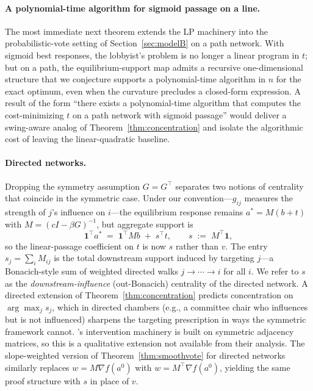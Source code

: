 \documentclass[11pt,letterpaper]{article}
\theoremstyle{plain}
\theoremstyle{definition}
\theoremstyle{remark}
\begin{document}
\paragraph{A polynomial-time algorithm for sigmoid passage on a line.} The most immediate next theorem extends the LP machinery into the probabilistic-vote setting of Section~\ref{sec:modelB} on a path network. With sigmoid best responses, the lobbyist's problem is no longer a linear program in $t$; but on a path, the equilibrium-support map admits a recursive one-dimensional structure that we conjecture supports a polynomial-time algorithm in $n$ for the exact optimum, even when the curvature precludes a closed-form expression. A result of the form ``there exists a polynomial-time algorithm that computes the cost-minimizing $t$ on a path network with sigmoid passage'' would deliver a swing-aware analog of Theorem~\ref{thm:concentration} and isolate the algorithmic cost of leaving the linear-quadratic baseline.

\paragraph{Directed networks.} Dropping the symmetry assumption $G = G^\top$ separates two notions of centrality that coincide in the symmetric case. Under our convention---$g_{ij}$ measures the strength of $j$'s influence on $i$---the equilibrium response remains $a^* = M(b + t)$ with $M = (cI - \beta G)^{-1}$, but aggregate support is
\[
\mathbf{1}^\top a^* \;=\; \mathbf{1}^\top M b \;+\; s^\top t, \qquad s \;:=\; M^\top \mathbf{1},
\]
so the linear-passage coefficient on $t$ is now $s$ rather than $v$. The entry $s_j = \sum_i M_{ij}$ is the total downstream support induced by targeting $j$---a Bonacich-style sum of weighted directed walks $j \to \cdots \to i$ for all $i$. We refer to $s$ as the \emph{downstream-influence} (out-Bonacich) centrality of the directed network. A directed extension of Theorem~\ref{thm:concentration} predicts concentration on $\arg\max_j s_j$, which in directed chambers (e.g., a committee chair who influences but is not influenced) sharpens the targeting prescription in ways the symmetric framework cannot. \citet{ggg2020}'s intervention machinery is built on symmetric adjacency matrices, so this is a qualitative extension not available from their analysis. The slope-weighted version of Theorem~\ref{thm:smoothvote} for directed networks similarly replaces $w = M \nabla f(a^0)$ with $w = M^\top \nabla f(a^0)$, yielding the same proof structure with $s$ in place of $v$.
\end{document}
